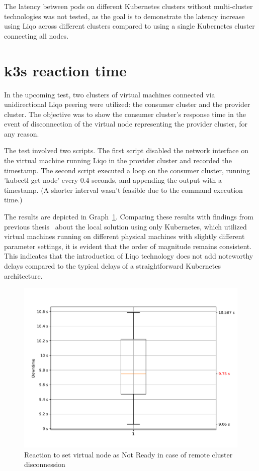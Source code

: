 The latency between pods on different Kubernetes clusters without multi-cluster technologies was not tested, as the goal is to demonstrate the latency increase using Liqo across different clusters compared to using a single Kubernetes cluster connecting all nodes.

\section{k3s reaction time}

In the upcoming test, two clusters of virtual machines connected via unidirectional Liqo peering were utilized: the consumer cluster and the provider cluster. The objective was to show the consumer cluster's response time in the event of disconnection of the virtual node representing the provider cluster, for any reason.

The test involved two scripts. The first script disabled the network interface on the virtual machine running Liqo in the provider cluster and recorded the timestamp. The second script executed a loop on the consumer cluster, running 'kubectl get node' every 0.4 seconds, and appending the output with a timestamp. (A shorter interval wasn't feasible due to the command execution time.)

The results are depicted in Graph~\ref{graph:k-reaction}. Comparing these results with findings from previous thesis~\cite{e3-1} about the local solution using only Kubernetes, which utilized virtual machines running on different physical machines with slightly different parameter settings, it is evident that the order of magnitude remains consistent. This indicates that the introduction of Liqo technology does not add noteworthy delays compared to the typical delays of a straightforward Kubernetes architecture.

\begin{figure}[ht]\centering
\includegraphics[scale=0.5]{Pictures/k3s-reaction}
\caption{Reaction to set virtual node as Not Ready in case of remote cluster disconnession}\label{graph:k-reaction}
\end{figure}

